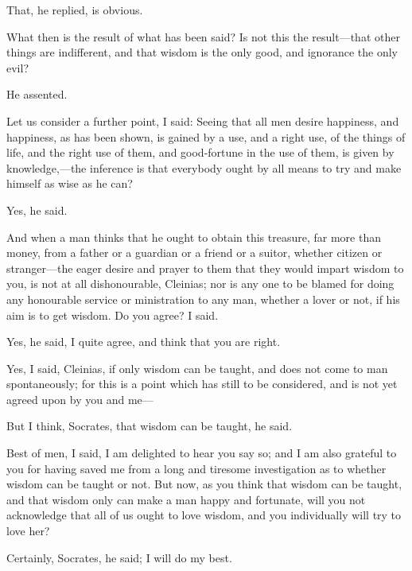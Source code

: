 \documentclass[11pt,letter]{article}
\begin{document}
\par  That, he replied, is obvious.

\par  What then is the result of what has been said? Is not this the result—that other things are indifferent, and that wisdom is the only good, and ignorance the only evil?

\par  He assented.

\par  Let us consider a further point, I said: Seeing that all men desire happiness, and happiness, as has been shown, is gained by a use, and a right use, of the things of life, and the right use of them, and good-fortune in the use of them, is given by knowledge,—the inference is that everybody ought by all means to try and make himself as wise as he can?

\par  Yes, he said.

\par  And when a man thinks that he ought to obtain this treasure, far more than money, from a father or a guardian or a friend or a suitor, whether citizen or stranger—the eager desire and prayer to them that they would impart wisdom to you, is not at all dishonourable, Cleinias; nor is any one to be blamed for doing any honourable service or ministration to any man, whether a lover or not, if his aim is to get wisdom. Do you agree? I said.

\par  Yes, he said, I quite agree, and think that you are right.

\par  Yes, I said, Cleinias, if only wisdom can be taught, and does not come to man spontaneously; for this is a point which has still to be considered, and is not yet agreed upon by you and me—

\par  But I think, Socrates, that wisdom can be taught, he said.

\par  Best of men, I said, I am delighted to hear you say so; and I am also grateful to you for having saved me from a long and tiresome investigation as to whether wisdom can be taught or not. But now, as you think that wisdom can be taught, and that wisdom only can make a man happy and fortunate, will you not acknowledge that all of us ought to love wisdom, and you individually will try to love her?

\par  Certainly, Socrates, he said; I will do my best.
\end{document}

